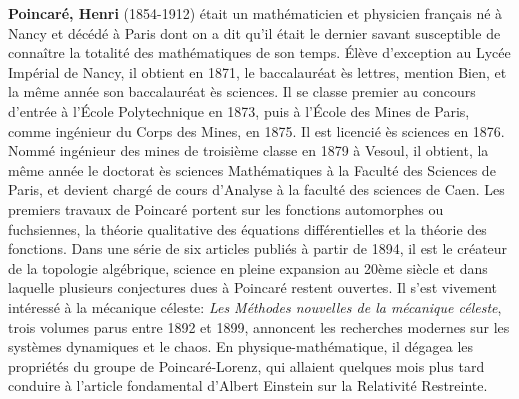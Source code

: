 \textbf{Poincaré, Henri} (1854-1912) était un mathématicien et physicien français né à Nancy et décédé à Paris dont on a dit qu'il était le dernier savant susceptible de connaître la totalité des mathématiques de son temps. Élève d'exception au Lycée Impérial de Nancy, il obtient en 1871, le baccalauréat ès lettres, mention Bien, et la même année son baccalauréat ès sciences. Il se classe premier au concours d'entrée à l'École Polytechnique en 1873, puis à l'École des Mines de Paris, comme ingénieur du Corps des Mines, en 1875. Il est licencié ès sciences en 1876. Nommé ingénieur des mines de troisième classe en 1879 à Vesoul, il obtient, la même année le doctorat ès sciences Mathématiques à la Faculté des Sciences de Paris, et devient chargé de cours d'Analyse à la faculté des sciences de Caen. Les premiers travaux de Poincaré portent sur les fonctions automorphes ou fuchsiennes, la théorie qualitative des équations différentielles et la théorie des fonctions. Dans une série de six articles publiés à partir de 1894, il est le créateur de la topologie algébrique, science en pleine expansion au 20ème siècle et dans laquelle plusieurs conjectures dues à Poincaré restent ouvertes. Il s'est vivement intéressé à la mécanique céleste: \textit{Les Méthodes nouvelles de la mécanique céleste}, trois volumes parus entre 1892 et 1899, annoncent les recherches modernes sur les systèmes dynamiques et le chaos. En physique-mathématique, il dégagea les propriétés du groupe de Poincaré-Lorenz, qui allaient quelques mois plus tard conduire à l'article fondamental d'Albert Einstein sur la Relativité Restreinte.

